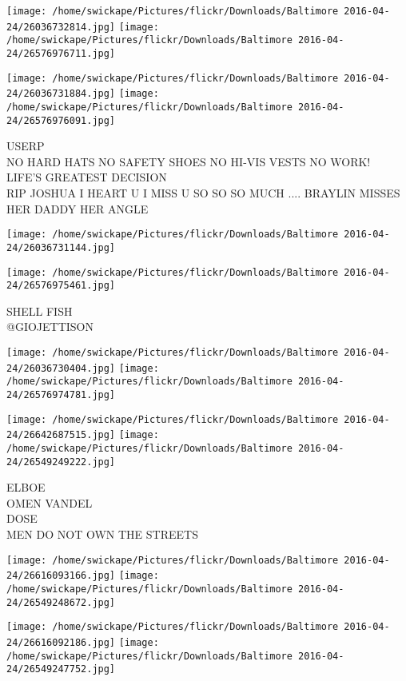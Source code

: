 \documentclass[10pt,letterpaper]{article}
\begin{document}
\texttt{[image: /home/swickape/Pictures/flickr/Downloads/Baltimore 2016-04-24/26036732814.jpg]}
\texttt{[image: /home/swickape/Pictures/flickr/Downloads/Baltimore 2016-04-24/26576976711.jpg]}

\texttt{[image: /home/swickape/Pictures/flickr/Downloads/Baltimore 2016-04-24/26036731884.jpg]}
\texttt{[image: /home/swickape/Pictures/flickr/Downloads/Baltimore 2016-04-24/26576976091.jpg]}

USERP\\
NO HARD HATS NO SAFETY SHOES NO HI{-}VIS VESTS NO WORK!\\
LIFE'S GREATEST DECISION\\
RIP JOSHUA I HEART U I MISS U SO SO SO MUCH .... BRAYLIN MISSES HER DADDY HER ANGLE\\
\pagebreak

\texttt{[image: /home/swickape/Pictures/flickr/Downloads/Baltimore 2016-04-24/26036731144.jpg]}

\vspace{0.25in}
\texttt{[image: /home/swickape/Pictures/flickr/Downloads/Baltimore 2016-04-24/26576975461.jpg]}

SHELL FISH\\
@GIOJETTISON\\
\pagebreak

\texttt{[image: /home/swickape/Pictures/flickr/Downloads/Baltimore 2016-04-24/26036730404.jpg]}
\texttt{[image: /home/swickape/Pictures/flickr/Downloads/Baltimore 2016-04-24/26576974781.jpg]}

\texttt{[image: /home/swickape/Pictures/flickr/Downloads/Baltimore 2016-04-24/26642687515.jpg]}
\texttt{[image: /home/swickape/Pictures/flickr/Downloads/Baltimore 2016-04-24/26549249222.jpg]}

ELBOE\\
OMEN VANDEL\\
DOSE\\
MEN DO NOT OWN THE STREETS\\
\pagebreak

\texttt{[image: /home/swickape/Pictures/flickr/Downloads/Baltimore 2016-04-24/26616093166.jpg]}
\texttt{[image: /home/swickape/Pictures/flickr/Downloads/Baltimore 2016-04-24/26549248672.jpg]}

\texttt{[image: /home/swickape/Pictures/flickr/Downloads/Baltimore 2016-04-24/26616092186.jpg]}
\texttt{[image: /home/swickape/Pictures/flickr/Downloads/Baltimore 2016-04-24/26549247752.jpg]}
\end{document}
